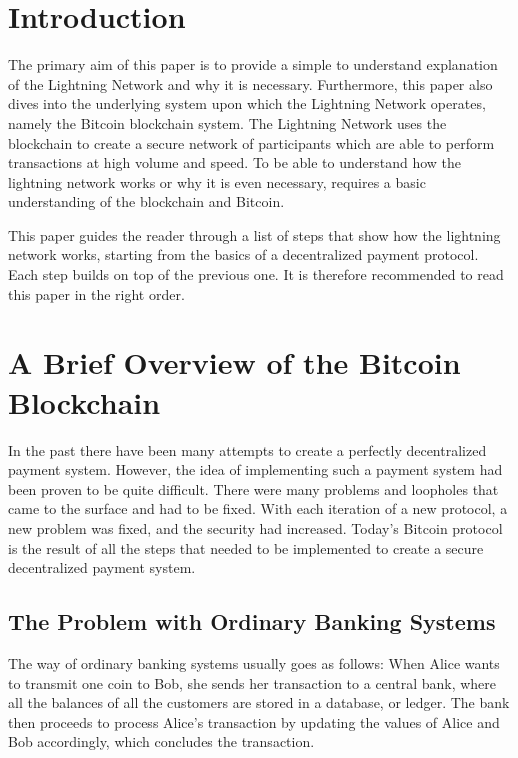 \documentclass[a4paper, 12pt]{report}
\begin{document}

\chapter{Introduction}

\par The primary aim of this paper is to provide a simple to understand explanation of the Lightning Network and why it is necessary. Furthermore, this paper also dives into the underlying system upon which the Lightning Network operates, namely the Bitcoin blockchain system. The Lightning Network uses the blockchain to create a secure network of participants which are able to perform transactions at high volume and speed. To be able to understand how the lightning network works or why it is even necessary, requires a basic understanding of the blockchain and Bitcoin.

\par This paper guides the reader through a list of steps that show how the lightning network works, starting from the basics of a decentralized payment protocol. Each step builds on top of the previous one. It is therefore recommended to read this paper in the right order.

\chapter{A Brief Overview of the Bitcoin Blockchain}

\par In the past there have been many attempts to create a perfectly decentralized payment system. However, the idea of implementing such a payment system had been proven to be quite difficult. There were many problems and loopholes that came to the surface and had to be fixed. With each iteration of a new protocol, a new problem was fixed, and the security had increased. Today’s Bitcoin protocol is the result of all the steps that needed to be implemented to create a secure decentralized payment system.

\section{The Problem with Ordinary Banking Systems}

\par The way of ordinary banking systems usually goes as follows: When Alice wants to transmit one coin to Bob, she sends her transaction to a central bank, where all the balances of all the customers are stored in a database, or ledger. The bank then proceeds to process Alice’s transaction by updating the values of Alice and Bob accordingly, which concludes the transaction.
\end{document}
